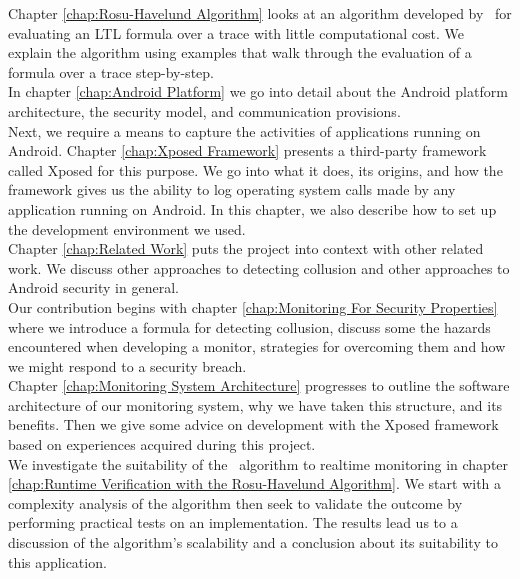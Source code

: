 \noindent Chapter \ref{chap:Rosu-Havelund Algorithm} looks at an algorithm developed by \GRKH\ for evaluating an LTL formula over a trace with little computational cost.  We explain the algorithm using examples that walk through the evaluation of a formula over a trace step-by-step.\\

\noindent In chapter \ref{chap:Android Platform} we go into detail about the Android platform architecture, the security model, and communication provisions.\\

\noindent Next, we require a means to capture the activities of applications running on Android. Chapter \ref{chap:Xposed Framework} presents a third-party framework called Xposed for this purpose.  We go into what it does, its origins, and how the framework gives us the ability to log operating system calls made by any application running on Android.  In this chapter, we also describe how to set up the development environment we used.\\

\noindent Chapter \ref{chap:Related Work} puts the project into context with other related work.  We discuss other approaches to detecting collusion and other approaches to Android security in general.\\

\noindent Our contribution begins with chapter \ref{chap:Monitoring For Security Properties} where we introduce a formula for detecting collusion, discuss some the hazards encountered when developing a monitor, strategies for overcoming them and how we might respond to a security breach.\\

\noindent Chapter \ref{chap:Monitoring System Architecture} progresses to outline the software architecture of our monitoring system, why we have taken this structure, and its benefits.  Then we give some advice on development with the Xposed framework based on experiences acquired during this project.\\

\noindent We investigate the suitability of the \RH\ algorithm to realtime monitoring in chapter \ref{chap:Runtime Verification with the Rosu-Havelund Algorithm}.  We start with a complexity analysis of the algorithm then seek to validate the outcome by performing practical tests on an implementation.  The results lead us to a discussion of the algorithm's scalability and a conclusion about its suitability to this application.\\

